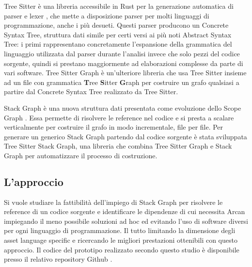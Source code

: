 
Tree Sitter \cite{TreeSitter} \`e una libreria accessibile in Rust per la generazione automatica di parser e lexer \cite{sestoft2017programming}, che mette a disposizione parser per molti linguaggi di programmazione, anche i pi\`u desueti. Questi parser producono un Concrete Syntax Tree, struttura dati simile per certi versi ai pi\`u noti Abstract Syntax Tree: i primi rappresentano concretamente l'espansione della grammatica del linguaggio utilizzata dal parser durante l'analisi invece che solo pezzi del codice sorgente, quindi si prestano maggiormente ad elaborazioni complesse da parte di vari software. Tree Sitter Graph \`e un'ulteriore libreria che usa Tree Sitter insieme ad un file con grammatica \textbf{T}ree \textbf{S}itter \textbf{G}raph per costruire un grafo qualsiasi a partire dal Concrete Syntax Tree realizzato da Tree Sitter.


Stack Graph \cite{StackGraph} \`e una nuova struttura dati presentata \cite{StackGraphNameResolutionAtScale} come evoluzione dello Scope Graph \cite{ScopeGraph}. Essa permette di risolvere le reference nel codice e si presta a scalare verticalmente per costruire il grafo in modo incrementale, file per file. Per generare un generico Stack Graph partendo dal codice sorgente \`e stata sviluppata Tree Sitter Stack Graph, una libreria che combina Tree Sitter Graph e Stack Graph per automatizzare il processo di costruzione.

\subsection{L'approccio}


Si vuole studiare la fattibilit\`a dell'impiego di Stack Graph per risolvere le reference di un codice sorgente e identificare le dipendenze di cui necessita Arcan impiegando il meno possibile soluzioni ad hoc ed evitando l'uso di software diversi per ogni linguaggio di programmazione. Il tutto limitando la dimensione degli asset language specific e ricercando le migliori prestazioni ottenibili con questo approccio. Il codice del prototipo realizzato secondo questo studio \`e disponibile presso il relativo repository Github \cite{SkullianRepository}.


